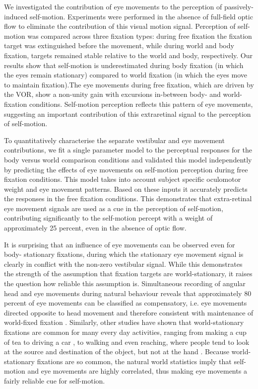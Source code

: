 We investigated the contribution of eye movements to the perception of passively-induced self-motion. Experiments were performed in the absence of full-field optic flow to eliminate the contribution of this visual motion signal. Perception of self-motion was compared across three fixation types: during free fixation the fixation target was extinguished before the movement, while during world and body fixation, targets  remained stable relative to the world and body, respectively. Our results show that self-motion is underestimated during body fixation (in which the eyes remain stationary) compared to world fixation (in which the eyes move to maintain fixation).The eye movements during free fixation, which  are driven by the VOR, show a non-unity gain with excursions in-between body- and world-fixation conditions. Self-motion perception reflects this pattern of eye movements, suggesting an important contribution of this extraretinal signal to the perception of self-motion.

 To quantitatively characterise the separate vestibular and eye movement contributions, we fit a single parameter model to the perceptual responses for the body versus world comparison conditions and validated this model independently by predicting the effects of eye movements on self-motion perception during free fixation conditions. This model takes into account subject specific oculomotor weight and eye movement patterns. Based on these inputs it accurately predicts the responses in the free fixation conditions. This demonstrates that extra-retinal eye movement signals are used as a cue in the perception of self-motion, contributing significantly to the self-motion percept with a weight of approximately 25 percent, even in the absence of optic flow.
 
It is surprising that an influence of eye movements can be observed even for body- stationary fixations, during which the stationary eye movement signal is clearly in conflict with the non-zero vestibular signal. While this demonstrates the strength of the assumption that fixation targets are world-stationary, it raises the question how reliable this assumption is. Simultaneous recording of angular head and eye movements during natural behaviour reveals that approximately 80 percent of eye movements can be classified as compensatory, i.e. eye movements directed opposite to head movement and therefore consistent with maintenance of world-fixed fixation \cite{einhauser2007}. Similarly, other studies have shown that world-stationary fixations are common for many every day activities, ranging from making a cup of tea \cite{hayhoe2014} to driving a car \cite{land1994}, to walking \cite{foulsham2011} and even reaching, where people tend to look at the source and destination of the object, but not at the hand \cite{flanagan2003}. Because world-stationary fixations are so common, the natural world statistics imply that self-motion and eye movements are highly correlated, thus making eye movements a fairly reliable cue for self-motion.

